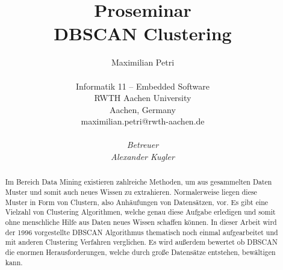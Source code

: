\documentclass{lni}
\author{
	Maximilian Petri \\ 
	\\ 
	Informatik 11 -- Embedded Software \\ 
	RWTH Aachen University \\ 
	Aachen, Germany \\ 
	maximilian.petri@rwth-aachen.de\\
	\\
	\textit{Betreuer}\\
	\textit{Alexander Kugler}\\ 
}
\title{\small{Proseminar} \\ \vspace{0.5cm} \Large{DBSCAN Clustering}}
\begin{document}
\maketitle

%
%

\begin{abstract}
Im Bereich Data Mining existieren zahlreiche Methoden, um aus gesammelten Daten Muster und somit auch neues Wissen zu extrahieren. Normalerweise liegen diese Muster in Form von Clustern, also Anhäufungen von Datensätzen, vor. Es gibt eine Vielzahl von Clustering Algorithmen, welche genau diese Aufgabe erledigen und somit ohne menschliche Hilfe aus Daten neues Wissen schaffen können. In dieser Arbeit wird der 1996 vorgestellte DBSCAN Algorithmus thematisch noch einmal aufgearbeitet und mit anderen Clustering Verfahren verglichen. Es wird außerdem bewertet ob DBSCAN die enormen Herausforderungen, welche durch große Datensätze entstehen, bewältigen kann.
\end{abstract}

%
%
\end{document}
